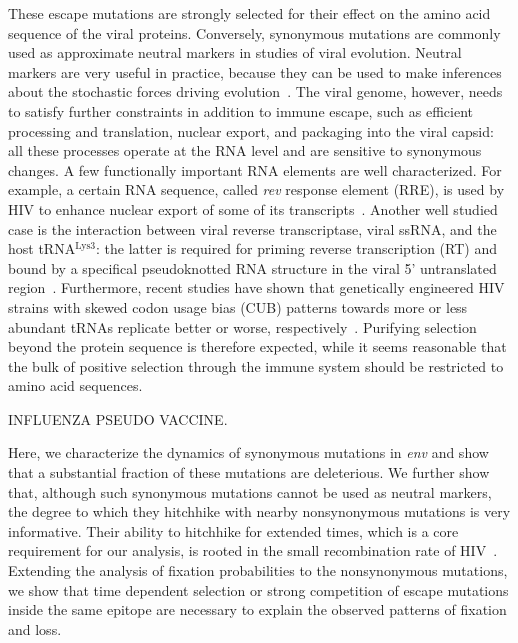 \documentclass[rmp, twocolumn]{revtex4}
\newcommand{\env}{\textit{env}}
\newcommand{\rev}{\textit{rev}}
\begin{document}
These escape mutations are strongly selected for their effect on the amino acid
sequence of the viral proteins. Conversely, synonymous mutations are commonly
used as approximate neutral markers in studies of viral evolution. Neutral
markers are very useful in practice, because they can be used to make inferences
about the stochastic forces driving evolution~\citep{yang_statistical_2000}.
The viral genome, however, needs to satisfy further constraints in addition to
immune escape, such as efficient processing and translation, nuclear export, and
packaging into the viral capsid: all these processes operate at the RNA level
and are sensitive to synonymous changes. A
few functionally important RNA elements are well characterized. For example, a certain RNA
sequence, called \rev{} response element (RRE), is used by HIV to enhance
nuclear export of some of its transcripts~\citep{fernandes_hiv-1_2012}. Another
well studied case is the interaction between viral reverse transcriptase, viral
ssRNA, and the host tRNA$^\text{Lys3}$: the latter is required for priming
reverse transcription (RT) and bound by a specifical pseudoknotted RNA structure
in the viral 5' untranslated region~\citep{barat_interaction_1991,
paillart_vitro_2002}. Furthermore, recent studies have shown that genetically
engineered HIV strains with skewed codon usage bias (CUB) patterns towards more
or less abundant tRNAs replicate better or worse,
respectively~\citep{ngumbela_quantitative_2008, li_codon-usage-based_2012}.
Purifying selection beyond the protein sequence is therefore expected, while it
seems reasonable that the bulk of positive selection through the immune system
should be restricted to amino acid sequences.

INFLUENZA PSEUDO VACCINE.


Here, we characterize the dynamics of synonymous mutations in \env{} and show
that a substantial fraction of these mutations are deleterious. We further show
that, although such synonymous mutations cannot be used as neutral markers, the
degree to which they hitchhike with nearby nonsynonymous mutations is very
informative. Their ability to hitchhike for extended times, which is a core
requirement for our analysis, is rooted in the small recombination rate of
HIV~\citep{neher_recombination_2010, batorsky_estimate_2011}. Extending the
analysis of fixation probabilities to the nonsynonymous mutations, we show that
time dependent selection or strong competition of escape mutations inside the
same epitope are necessary to explain the observed patterns of fixation and
loss.
\end{document}
